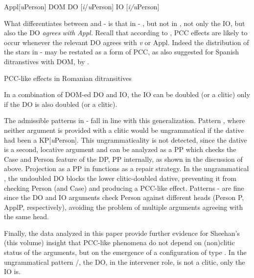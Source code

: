 \documentclass[output=paper,colorlinks,citecolor=brown,nonflat]{./langscibook}
\begin{document}
\ea%
   \label{ex:cornilescu:36}
   Appl[\textit{u}Person] \hspace{0.8cm} DOM DO [\textit{i}/\textit{u}Person] \hspace{0.8cm} IO [\textit{i/u}Person]
   \z

        

What differentiates between  and - is that in - , but not in , not only the IO, but also the DO \textit{agrees} \textit{with} \textit{Appl.} Recall that according to \citet{Preminger2016}, PCC effects are likely to occur whenever the relevant DO agrees with \textit{v} or Appl. Indeed the distribution of the stars in -  may be restated as a form of PCC, as also suggested for Spanish ditranstives with DOM, by \citet{OrmazabalRomero2013Borealis}.

\ea%
   \label{ex:cornilescu:37}
   PCC-like effects in Romanian ditransitives
   \z

 

In a combination of DOM-ed DO and IO, the IO can be doubled (or a clitic) only if the DO is also doubled (or a clitic). 

The admissible patterns in - fall in line with this generalization. Pattern , where neither argument is provided with a clitic would be ungrammatical if the dative had been a KP[\textit{u}Person]. This ungrammaticality is not detected, since the dative is a second, locative argument and can be analyzed as a PP which checks the Case and Person feature of the DP, PP internally, as shown in the discussion of  above. Projection as a PP in  functions as a repair strategy. In the ungrammatical , the undoubled DO blocks the lower clitic-doubled dative, preventing it from checking Person (and Case) and producing a PCC-like effect. Patterns - are fine since the DO and IO arguments check Person against different heads (Person P, ApplP, respectively), avoiding the problem of multiple arguments agreeing with the same head.

Finally, the data analyzed in this paper provide further evidence for Sheehan’s (this volume) insight that PCC-like phenomena do not depend on (non)clitic status of the arguments, but on the emergence of a configuration of type . In the ungrammatical pattern /, the DO, in the intervener role, is not a clitic, only the IO is.
\end{document}
